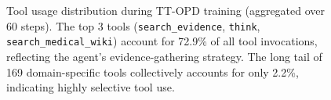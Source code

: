 \begin{figure}[t]
\caption{Tool usage distribution during TT-OPD training (aggregated over 60 steps). The top 3 tools (\texttt{search\_evidence}, \texttt{think}, \texttt{search\_medical\_wiki}) account for 72.9\% of all tool invocations, reflecting the agent's evidence-gathering strategy. The long tail of 169 domain-specific tools collectively accounts for only 2.2\%, indicating highly selective tool use.}
\label{fig:tool_usage}
\end{figure}


